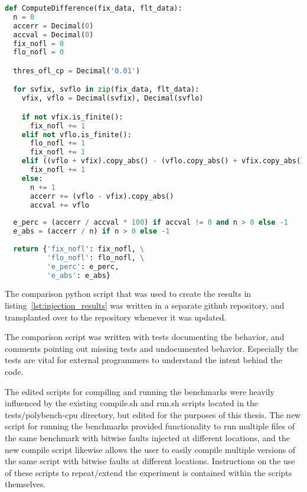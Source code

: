 \begin{lstlisting}[label=lst:validate_original,caption=Validate original,language=python]
def ComputeDifference(fix_data, flt_data):
  n = 0
  accerr = Decimal(0)
  accval = Decimal(0)
  fix_nofl = 0
  flo_nofl = 0

  thres_ofl_cp = Decimal('0.01')

  for svfix, svflo in zip(fix_data, flt_data):
    vfix, vflo = Decimal(svfix), Decimal(svflo)

    if not vfix.is_finite():
      fix_nofl += 1
    elif not vflo.is_finite():
      flo_nofl += 1
      fix_nofl += 1
    elif ((vflo + vfix).copy_abs() - (vflo.copy_abs() + vfix.copy_abs())) > thres_ofl_cp:
      fix_nofl += 1
    else:
      n += 1
      accerr += (vflo - vfix).copy_abs()
      accval += vflo
      
  e_perc = (accerr / accval * 100) if accval != 0 and n > 0 else -1
  e_abs = (accerr / n) if n > 0 else -1
      
  return {'fix_nofl': fix_nofl, \
          'flo_nofl': flo_nofl, \
          'e_perc': e_perc,
          'e_abs': e_abs}
\end{lstlisting}




The comparison python script that was used to create the results in listing~\ref{lst:injection_results} was written in a separate github repository, and transplanted over to the \taffo{} repository whenever it was updated.

The comparison script was written with tests documenting the behavior, and comments pointing out missing tests and undocumented behavior. Especially the tests are vital for external programmers to understand the intent behind the code.

The edited scripts for compiling and running the benchmarks were heavily influenced by the existing compile.sh and run.sh scripts located in the tests/polybench-cpu directory, but edited for the purposes of this thesis. The new script for running the benchmarks provided functionality to run multiple files of the same benchmark with bitwise faults injected at different locations, and the new compile script likewise allows the user to easily compile multiple versions of the same script with bitwise faults at different locations. Instructions on the use of these scripts to repeat/extend the experiment is contained within the scripts themselves.



